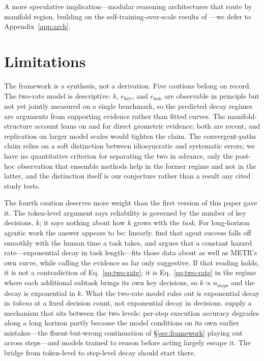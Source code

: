 A more speculative implication---modular reasoning architectures that route by manifold region, building on the self-training-over-scale results of \citet{costello2025think}---we defer to Appendix~\ref{app:arch}.

\section{Limitations}
\label{sec:limitations}

The framework is a synthesis, not a derivation. Five cautions belong on record. The two-rate model is descriptive: $k$, $e_{\text{key}}$, and $e_{\text{non}}$ are observable in principle but not yet jointly measured on a single benchmark, so the predicted decay regimes are arguments from supporting evidence rather than fitted curves. The manifold-structure account leans on \citet{li2025unraveling} and \citet{robinson2025token} for direct geometric evidence; both are recent, and replication on larger model scales would tighten the claim. The convergent-paths claim relies on a soft distinction between idiosyncratic and systematic errors; we have no quantitative criterion for separating the two in advance, only the post-hoc observation that ensemble methods help in the former regime and not in the latter, and the distinction itself is our conjecture rather than a result any cited study tests.

The fourth caution deserves more weight than the first version of this paper gave it. The token-level argument says reliability is governed by the number of key decisions, $k$; it says nothing about how $k$ grows with the \emph{task}. For long-horizon agentic work the answer appears to be: linearly. \citet{kwa2025measuring} find that agent success falls off smoothly with the human time a task takes, and \citet{ord2025halflife} argues that a constant hazard rate---exponential decay in task length---fits those data about as well as METR's own curve, while calling the evidence so far only suggestive. If that reading holds, it is not a contradiction of Eq.~\ref{eq:two-rate}; it is Eq.~\ref{eq:two-rate} in the regime where each additional subtask brings its own key decisions, so $k \propto n_{\text{steps}}$ and the decay is exponential in $k$. What the two-rate model rules out is exponential decay in \emph{tokens} at a fixed decision count, not exponential decay in decisions. \citet{sinha2025illusion} supply a mechanism that sits between the two levels: per-step execution accuracy degrades along a long horizon partly because the model conditions on its own earlier mistakes---the fluent-but-wrong continuation of \S\ref{sec:framework} playing out across steps---and models trained to reason before acting largely escape it. The bridge from token-level to step-level decay should start there.

